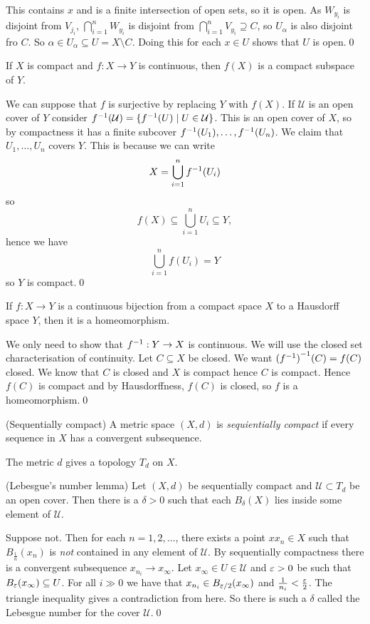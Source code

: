 \documentclass{article}
\begin{document}
This contains $ x $ and is a finite intersection of open sets, so it is open. As $ W_{y_i} $ is disjoint from $ V_{j_i} $, $ \bigcap_{i=1}^n W_{y_i} $ is disjoint from $ \bigcap_{i=1}^n V_{y_i}\supseteq C $, so $ U_\alpha $ is also disjoint fro $ C $. So $ \alpha\in U_\alpha \subseteq U =X\setminus C $. Doing this for each $ x\in U $ shows that $ U $ is open.\qed
\begin{proposition}
  If $ X $ is compact and $ f:X\to Y $ is continuous, then $ f(X) $ is a compact subspace of $ Y $.
\end{proposition}
\pf We can suppose that $ f $ is surjective by replacing $ Y $ with $ f(X) $. If $ \mathcal U $ is an open cover of $ Y $ consider $ {f}^{-1}(\mathcal U) = \{{f}^{-1}(U) \mid U\in \mathcal U\} $. This is an open cover of $ X $, so by compactness it has a finite subcover $ {f}^{-1} (U_1),\dots, {f}^{-1}(U_n) $. We claim that $ U_1,\dots, U_n $ covers $ Y $. This is because we can write
\begin{align*}
	X = \bigcup_{i=1}^n {f}^{-1}(U_i)
\end{align*}
so
\[
	f(X) \subseteq \bigcup_{i=1}^n U_i \subseteq Y,
\]
hence we have
\[
	\bigcup_{i=1}^n f(U_i) = Y
\]
so $ Y $ is compact.\qed
\begin{corollary}
  If $ f:X\to Y $ is a continuous bijection from a compact space $ X $ to a Hausdorff space $ Y $, then it is a homeomorphism.
\end{corollary}
\pf We only need to show that $ {f}^{-1}:Y\to X $ is continuous. We will use the closed set characterisation of continuity. Let $ C\subseteq X $ be closed. We want $ {({f}^{-1})}^{-1}(C) = f(C) $ closed. We know that $ C $ is closed and $ X $ is compact hence $ C $ is compact. Hence $ f(C) $ is compact and by Hausdorffness, $ f(C) $ is closed, so $ f $ is a homeomorphism.\qed
\begin{definition}
	(Sequentially compact) A metric space $ (X,d) $ is \textit{sequientially compact} if every sequence in $ X $ has a convergent subsequence.
\end{definition}
The metric $ d $ gives a topology $ T_d $ on $ X $.
\begin{lemma}
	(Lebesgue's number lemma) Let $ (X,d) $ be sequentially compact and $ \mathcal U \subset T_d $ be an open cover.  Then there is a $ \delta>0 $ such that each $ B_\delta (X) $ lies inside some element of $ \mathcal U $.
\end{lemma}
\pf Suppose not. Then for each $ n=1,2,\dots $, there exists a point $ xx_n \in X$ such that $ B_{\frac 1n}(x_n) $ is \textit{not} contained in any element of $ \mathcal U $. By sequentially compactness there is a convergent subsequence $ x_{n_i}\to x_\infty $. Let $ x_\infty\in U\in \mathcal U $ and $ \varepsilon>0 $ be such that $ B_\varepsilon (x_\infty)\subseteq U $. For all $ i\gg 0 $ we have that $ x_{n_i}\in B_{\varepsilon/2}(x_\infty) $ and $ \frac 1{n_i} < \frac {\varepsilon} 2 $. The triangle inequality gives a contradiction from here. So there is such a $ \delta $ called the Lebesgue number for the cover $ \mathcal U $.\qed
\end{document}
